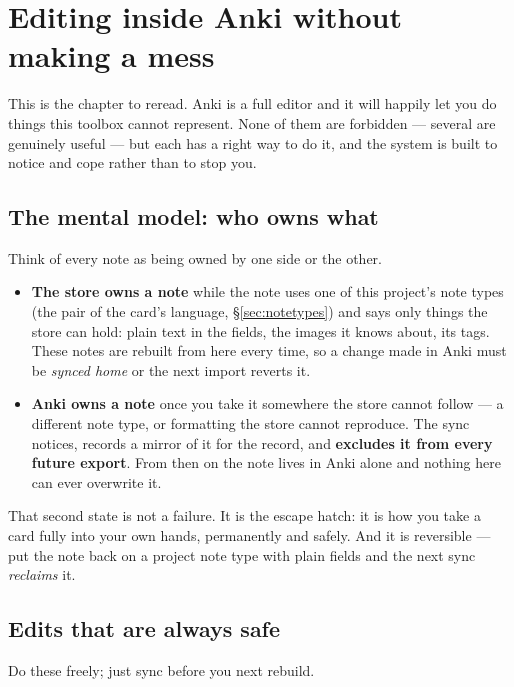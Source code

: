 \documentclass[11pt,oneside]{report}
\begin{document}
\chapter{Editing inside Anki without making a mess}
\label{ch:anki-editing}

This is the chapter to reread. Anki is a full editor and it will happily let
you do things this toolbox cannot represent. None of them are forbidden ---
several are genuinely useful --- but each has a right way to do it, and the
system is built to notice and cope rather than to stop you.

\section{The mental model: who owns what}

Think of every note as being owned by one side or the other.

\begin{itemize}
\item \textbf{The store owns a note} while the note uses one of this
  project's note types (the pair of the card's language,
  \S\ref{sec:notetypes}) and says only things the store can hold: plain
  text in the fields, the images it knows about, its tags. These notes are
  rebuilt from here every time, so a change made in Anki must be
  \emph{synced home} or the next import reverts it.
\item \textbf{Anki owns a note} once you take it somewhere the store cannot
  follow --- a different note type, or formatting the store cannot
  reproduce. The sync notices, records a mirror of it for the record, and
  \textbf{excludes it from every future export}. From then on the note lives
  in Anki alone and nothing here can ever overwrite it.
\end{itemize}

That second state is not a failure. It is the escape hatch: it is how you
take a card fully into your own hands, permanently and safely. And it is
reversible --- put the note back on a project note type with plain fields
and the next sync \emph{reclaims} it.

\section{Edits that are always safe}

Do these freely; just sync before you next rebuild.
\end{document}
